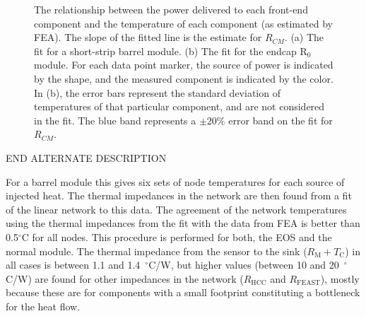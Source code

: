 \begin{figure}[ht]
\centering
{}
\caption{The relationship between the power delivered to each front-end component and the temperature
of each component (as estimated by FEA). The slope of the fitted line is the estimate for $R_{CM}$.
(a) The fit for a short-strip barrel module. (b) The fit for the endcap R$_0$ module.
For each data point marker, the source of power is indicated by the shape, and the measured component is indicated
by the color.
In (b), the error bars represent the standard deviation of temperatures of
that particular component, and are not considered in the fit.
The blue band represents a $\pm$20\% error band on the fit for $R_{CM}$.
}
\label{fig:solving_for_Rcm}
\end{figure}

END ALTERNATE DESCRIPTION

For a barrel module this gives six sets of node temperatures for each source of injected heat. The thermal impedances in the network are then found from a fit of the linear network to this data. The agreement of the network temperatures using the thermal impedances from the fit with the data from FEA is better than 0.5$^\circ$C for all nodes. This procedure is performed for both, the EOS and the normal module. The thermal impedance from the sensor to the sink ($R_\text{M}+T_\text{C}$) in all cases is between 1.1 and 1.4~$^\circ$C/W, but higher values (between 10 and 20~$^\circ$C/W) are found for other impedances in the network ($R_\text{HCC}$ and $R_\text{FEAST}$), mostly because these are for components with a small footprint constituting a bottleneck for the heat flow.


